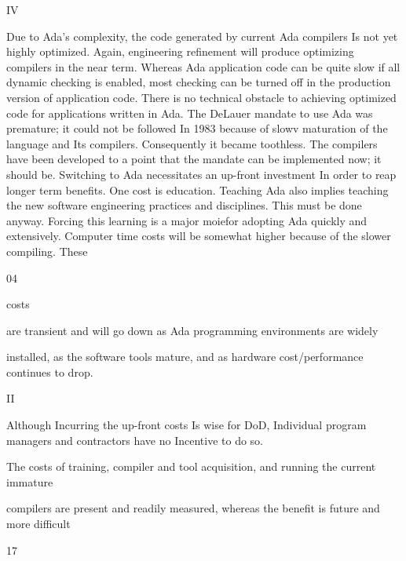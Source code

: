 \documentclass[12pt]{article}
\begin{document}
IV

Due to Ada's complexity, the code generated by current Ada compilers Is
not yet highly optimized.
Again, engineering refinement will produce optimizing compilers in the near term.
Whereas Ada application code can be quite slow if all dynamic checking is enabled, most
checking can be turned off in the production version of application code. There is no
technical obstacle to achieving optimized code for applications written in Ada.
The DeLauer mandate to use Ada was premature; it could not be followed
In 1983 because of slowv maturation of the language and Its compilers.
Consequently it became toothless. The compilers have been developed to a point that
the mandate can be implemented now; it should be.
Switching to Ada necessitates an up-front investment In order to reap longer
term benefits.
One cost is education. Teaching Ada also implies teaching the new software engineering
practices and disciplines. This must be done anyway. Forcing this learning is a major
moiefor adopting Ada quickly and extensively.
Computer time costs will be somewhat higher because of the slower compiling. These

04

costs

are transient and will go down as Ada programming environments are widely

installed, as the software tools mature, and as hardware cost/performance continues to
drop.

II

Although Incurring the up-front costs Is wise for DoD, Individual program
managers and contractors have no Incentive to do so.

The costs of training, compiler and tool acquisition, and running the current immature

compilers are present and readily measured, whereas the benefit is future and more difficult

17
\end{document}
